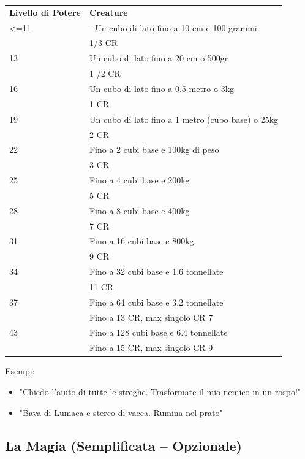 \documentclass[a4paper,11pt,twoside,openany]{book}
\begin{document}
\bigskip

\begin{tabularx}{\textwidth}{lX}
	\toprule
	\textbf{Livello di Potere} & \textbf{Creature}\tabularnewline
	<=11   & - Un cubo di lato fino a 10 cm e 100 grammi  \\
	  & 1/3 CR    \\
	13& Un cubo di lato fino a 20 cm o 500gr  \\
	  & 1 /2 CR   \\
	16& Un cubo di lato fino a 0.5 metro o 3kg  \\
	  & 1 CR \\
	19& Un cubo di lato fino a 1 metro (cubo base) o 25kg \\
	  & 2 CR \\
	22& Fino a 2 cubi base e 100kg di peso \\
	  & 3 CR \\
	25& Fino a 4 cubi base e 200kg    \\
	  & 5 CR \\
	28& Fino a 8 cubi base e 400kg    \\
	  & 7 CR \\
	31& Fino a 16 cubi base e 800kg   \\
	  & 9 CR \\
	34& Fino a 32 cubi base e 1.6 tonnellate    \\
	  & 11 CR\\
	37& Fino a 64 cubi base e 3.2 tonnellate    \\
	  & Fino a 13 CR, max singolo CR 7\\
	43& Fino a 128 cubi base e 6.4 tonnellate   \\
	  & Fino a 15 CR, max singolo CR 9\\
\end{tabularx}

\bigskip


Esempi:
\begin{itemize}
	\item
	 "Chiedo l'aiuto di tutte le streghe. Trasformate il mio nemico in un rospo!"
	\item
	 "Bava di Lumaca e sterco di vacca. Rumina nel prato"
\end{itemize}

\pagebreak

\subsection{La Magia (Semplificata -- Opzionale)}
\end{document}
